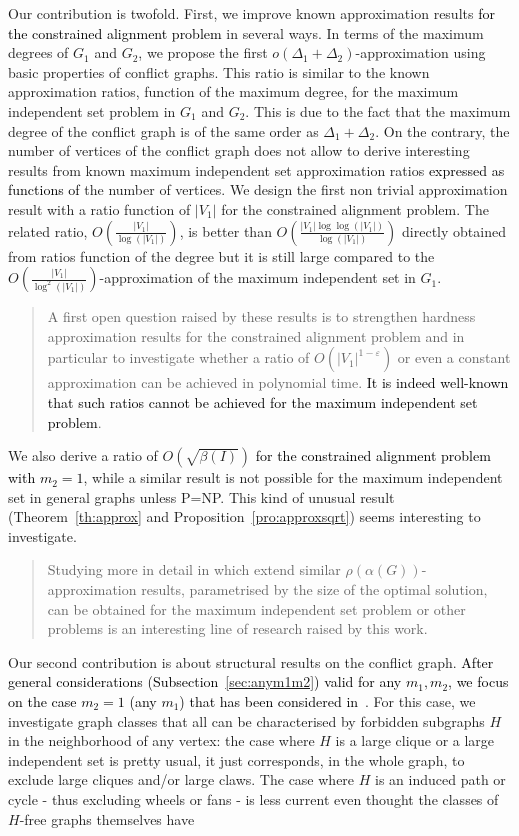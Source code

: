 \documentclass[final]{dmtcs-episciences}
\newcommand\mar[1]{\textcolor{black}{#1}}
\begin{document}
Our contribution is twofold. First, we improve known approximation results \mar{for the constrained alignment problem} in several ways.  In terms of the maximum degrees of $G_1$ and $G_2$,  we propose the first $o(\Delta_1+\Delta_2)$-approximation using basic properties of conflict graphs. This ratio is similar to the known approximation ratios, function of the maximum degree, for the maximum independent set problem in $G_1$ and $G_2$. This is due to the fact that the maximum degree of the conflict graph is of the same order as $\Delta_1+\Delta_2$. On the contrary, the number of vertices of the conflict graph does not allow to derive interesting results from known maximum independent set approximation ratios \mar{expressed as functions of} the number of vertices. We design the first non trivial approximation result with a ratio function of $|V_1|$ for the constrained alignment problem.  The related ratio, $O(\frac{|V_1|}{\log(|V_1|)})$, is better than $O\left(\frac{|V_1|\log\log(|V_1|)}{\log(|V_1|)}\right)$ directly obtained from ratios function of the degree but it is still large compared to the $O(\frac{|V_1|}{\log^2(|V_1|)})$-approximation of the maximum independent set in $G_1$. 
\begin{quote}
A first open question raised by these results is 
to strengthen  hardness approximation results for the constrained alignment problem and in particular to investigate whether a ratio of $O(|V_1|^{1-\varepsilon})$ or even a constant approximation can be achieved in polynomial time. \mar{It is indeed well-known that such ratios cannot be achieved for the maximum independent set problem}.
\end{quote}
We also derive a ratio of $O(\sqrt{\beta(I)})$ \mar{for the constrained alignment problem with $m_2=1$}, while a similar result is not possible for the maximum independent set in general graphs unless P=NP. This kind of unusual result (Theorem~\ref{th:approx} and Proposition~\ref{pro:approxsqrt}) seems  interesting to investigate.
\begin{quote}
Studying more in detail in which extend similar $\rho(\alpha(G))$-approximation results, parametrised by the size of the optimal solution,  can be obtained for the maximum independent set problem or other problems is  an interesting line of research raised by this work.\end{quote}
 Our second contribution is about structural results on the conflict graph. \mar{After general considerations (Subsection~\ref{sec:anym1m2}) valid for any $m_1,m_2$, we focus on the case $m_2=1$ (any $m_1$) that has been considered in~\cite{Fagnot2008,Fertin200990}}. For this case, we investigate graph classes that all can be characterised by forbidden subgraphs $H$ in the neighborhood of any vertex: the case where $H$ is a large clique or a large independent set is pretty usual, it just corresponds, in the whole graph, to  exclude large cliques and/or large claws. The case where $H$ is an induced path or cycle \-- thus excluding wheels or fans \-- is less current even thought the classes of $H$-free graphs themselves have 
\end{document}
